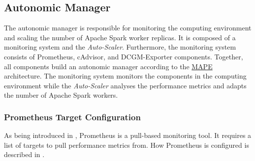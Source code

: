 \newpage
\subsection{Autonomic Manager}
The autonomic manager is responsible for monitoring the computing environment and scaling the number of Apache Spark worker replicas.
It is composed of a monitoring system and the \textit{Auto-Scaler}.
Furthermore, the monitoring system consists of Prometheus, cAdvisor, and DCGM-Exporter components.
Together, all components build an autonomic manager according to the \hyperlink{abbr:mape}{MAPE} architecture.
The monitoring system monitors the components in the computing environment while the \textit{Auto-Scaler} analyses the performance metrics and adapts the number of Apache Spark workers.


\subsubsection{Prometheus Target Configuration}




As being introduced in , Prometheus is a pull-based monitoring tool.
It requires a list of targets to pull performance metrics from. How Prometheus is configured is described in .


